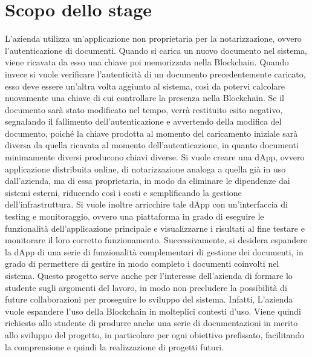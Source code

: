\section*{Scopo dello stage}
L'azienda utilizza un'applicazione non proprietaria per la notarizzazione, ovvero l'autenticazione di documenti. Quando si carica un nuovo documento nel sistema, viene ricavata da esso una chiave poi memorizzata nella Blockchain. 
Quando invece si vuole verificare l'autenticità di un documento precedentemente caricato, esso deve essere un'altra volta aggiunto al sistema, così da potervi calcolare nuovamente una chiave di cui controllare la presenza nella Blockchain. Se il documento sarà stato modificato nel tempo, verrà restituito esito negativo, segnalando il fallimento dell'autenticazione e avvertendo della modifica del documento, poiché la chiave prodotta al momento del caricamento iniziale sarà diversa da quella ricavata al momento dell'autenticazione, in quanto documenti minimamente diversi producono chiavi diverse.
\newline
Si vuole creare una dApp, ovvero applicazione distribuita online, di notarizzazione analoga a quella già in uso dall'azienda, ma di essa proprietaria, in modo da eliminare le dipendenze dai sistemi esterni, riducendo così i costi e semplificando la gestione dell'infrastruttura. Si vuole inoltre arricchire tale dApp con un'interfaccia di testing e monitoraggio, ovvero una piattaforma in grado di eseguire le funzionalità dell'applicazione principale e visualizzarne i risultati al fine testare e monitorare il loro corretto funzionamento. Successivamente, si desidera espandere la dApp di una serie di funzionalità complementari di gestione dei documenti, in grado di permettere di gestire in modo completo i documenti coinvolti nel sistema. 
\newline
Questo progetto serve anche per l'interesse dell'azienda di formare lo studente sugli argomenti del lavoro, in modo non precludere la possibilità di future collaborazioni per proseguire lo sviluppo del sistema. Infatti, L'azienda vuole espandere l'uso della Blockchain in molteplici contesti d'uso. Viene quindi richiesto allo studente di produrre anche una serie di documentazioni in merito allo sviluppo del progetto, in particolare per ogni obiettivo prefissato, facilitando la comprensione e quindi la realizzazione di progetti futuri.